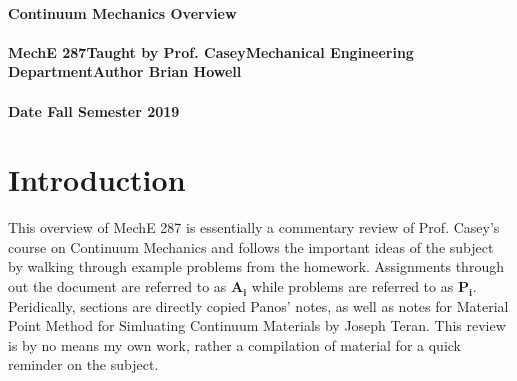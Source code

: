 \documentclass[a4paper]{article}
\begin{document}
\begin{titlepage}

\centering
\paragraph*{\huge \linebreak\linebreak \linebreak Continuum Mechanics Overview}


\paragraph*{ \large MechE 287\linebreak \linebreak \normalsize Taught by Prof. Casey\linebreak Mechanical Engineering Department\linebreak\linebreak  \linebreak \linebreak\linebreak \linebreak \linebreak \linebreak \large \linebreak \linebreak \linebreak \linebreak\linebreak \linebreak Author \linebreak \linebreak \normalsize  Brian Howell}

\paragraph*{\linebreak \linebreak \large Date \normalsize \linebreak \linebreak Fall Semester 2019}

\end{titlepage}

\pagebreak


\pagebreak

\pagebreak
\section{Introduction}
This overview of MechE 287 is essentially a commentary review of Prof. Casey's course on Continuum Mechanics and follows the important ideas of the subject by walking through example problems from the homework. Assignments through out the document are referred to as $\mathbf{A_i}$ while problems are referred to as $\mathbf{P_i}$. Peridically, sections are directly copied Panos' notes, as well as notes for Material Point Method for Simluating Continuum Materials by Joseph Teran. This review is by no means my own work, rather a compilation of material for a quick reminder on the subject. 
\end{document}
